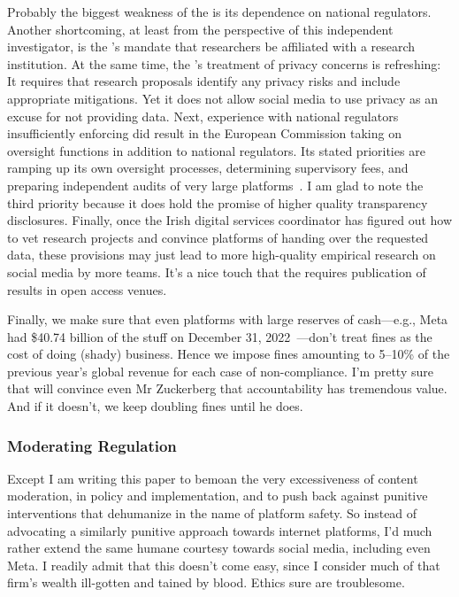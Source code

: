 Probably the biggest weakness of the  is its dependence on national
regulators. Another shortcoming, at least from the perspective of this
independent investigator, is the 's mandate that researchers be
affiliated with a research institution. At the same time, the 's
treatment of privacy concerns is refreshing: It requires that research proposals
identify any privacy risks and include appropriate mitigations. Yet it does not
allow social media to use privacy as an excuse for not providing data. Next,
experience with national regulators insufficiently enforcing  did result
in the European Commission taking on  oversight functions in addition to
national regulators. Its stated priorities are ramping up its own oversight
processes, determining supervisory fees, and preparing independent audits of
very large platforms~\cite{Bertuzzi2022,TenThije2022}. I am glad to note the
third priority because it does hold the promise of higher quality transparency
disclosures. Finally, once the Irish digital services coordinator has figured
out how to vet research projects and convince platforms of handing over the
requested data, these provisions may just lead to more high-quality empirical
research on social media by more teams. It's a nice touch that the 
requires publication of results in open access venues.

Finally, we make sure that even platforms with large reserves of cash---e.g.,
Meta had \$40.74 billion of the stuff on December 31,
2022~\cite{MetaPlatforms2023}---don't treat fines as the cost of doing (shady)
business. Hence we impose fines amounting to 5--10\% of the previous year's
global revenue for each case of non-compliance. I'm pretty sure that will
convince even Mr Zuckerberg that accountability has tremendous value. And if it
doesn't, we keep doubling fines until he does.


\subsubsection{Moderating Regulation}
\label{sec:moderating:regulation}

Except I am writing this paper to bemoan the very excessiveness of content
moderation, in policy and implementation, and to push back against punitive
interventions that dehumanize in the name of platform safety. So instead of
advocating a similarly punitive approach towards internet platforms, I'd much
rather extend the same humane courtesy towards social media, including even
Meta. I readily admit that this doesn't come easy, since I consider much of that
firm's wealth ill-gotten and tained by blood. Ethics sure are troublesome.

